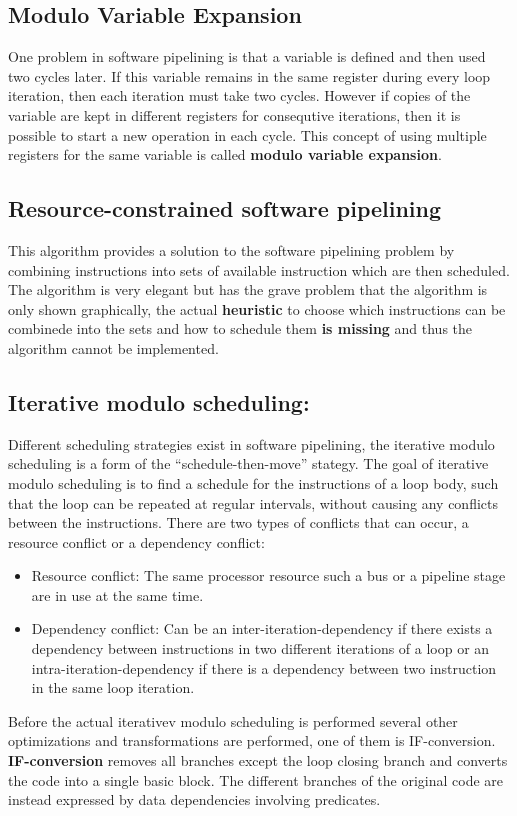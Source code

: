 \documentclass[a4paper,10pt]{article}
\begin{document}
\subsection{Modulo Variable Expansion}
One problem in software pipelining is that a variable is defined and then used two cycles later. If
this variable remains in the same register during every loop iteration, then each iteration must take two cycles. However if copies of
the variable are kept in different registers for consequtive iterations, then it is possible to start a new operation in each cycle.
This concept of using multiple registers for the same variable is called \textbf{modulo variable expansion}.


\subsection{Resource-constrained software pipelining}
This algorithm provides a solution to the software pipelining problem by combining instructions into sets of available instruction which
are then scheduled. The algorithm is very elegant but has the grave problem that the algorithm is only shown graphically, the actual
\textbf{heuristic} to choose which instructions can be combinede into the sets and how to schedule them \textbf{is missing} and thus the
algorithm cannot be implemented.

\subsection{Iterative modulo scheduling:}
Different scheduling strategies exist in software pipelining, the iterative modulo scheduling is a form of the ``schedule-then-move''
stategy. The goal of iterative modulo scheduling is to find a schedule for the instructions of a loop body, such that the loop
can be repeated at regular intervals, without causing any conflicts between the instructions. There are two types of conflicts that can
occur, a resource conflict or a dependency conflict:
\begin{itemize}
 \item Resource conflict: The same processor resource such a bus or a pipeline stage are in use at the same time.
 \item Dependency conflict: Can be an inter-iteration-dependency if there exists a dependency between instructions in two different
       iterations of a loop or an intra-iteration-dependency if there is a dependency between two instruction in the same loop iteration.
\end{itemize}
Before the actual iterativev modulo scheduling is performed several other optimizations and transformations are performed, one of them is
IF-conversion. \textbf{IF-conversion} removes all branches except the loop closing branch and converts the code into a single basic block. The different branches of the original code are instead expressed by data dependencies involving predicates.
\end{document}
